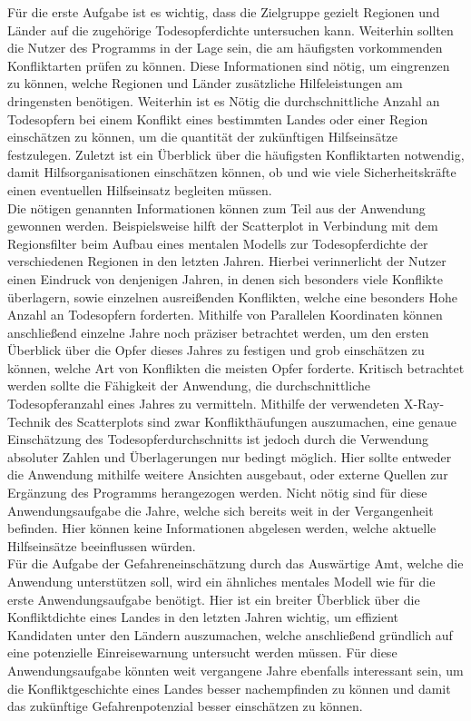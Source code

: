 \documentclass[usegeometry=true]{scrartcl}
\begin{document}
Für die erste Aufgabe ist es wichtig, dass die Zielgruppe gezielt Regionen und Länder auf die zugehörige Todesopferdichte untersuchen kann. Weiterhin sollten die Nutzer des Programms in der Lage sein, die am häufigsten vorkommenden Konfliktarten prüfen zu können. Diese Informationen sind nötig, um eingrenzen zu können, welche Regionen und Länder zusätzliche Hilfeleistungen am dringensten benötigen. Weiterhin ist es Nötig die durchschnittliche Anzahl an Todesopfern bei einem Konflikt eines bestimmten Landes oder einer Region einschätzen zu können, um die quantität der zukünftigen Hilfseinsätze festzulegen. Zuletzt ist ein Überblick über die häufigsten Konfliktarten notwendig, damit Hilfsorganisationen einschätzen können, ob und wie viele Sicherheitskräfte einen eventuellen Hilfseinsatz begleiten müssen.\\ Die nötigen genannten Informationen können zum Teil aus der Anwendung gewonnen werden. Beispielsweise hilft der Scatterplot in Verbindung mit dem Regionsfilter beim Aufbau eines mentalen Modells zur Todesopferdichte der verschiedenen Regionen in den letzten Jahren. Hierbei verinnerlicht der Nutzer einen Eindruck von denjenigen Jahren, in denen sich besonders viele Konflikte überlagern, sowie einzelnen \glqq ausreißenden\grqq{} Konflikten, welche eine besonders Hohe Anzahl an Todesopfern forderten. Mithilfe von Parallelen Koordinaten können anschließend einzelne Jahre noch präziser betrachtet werden, um den ersten Überblick über die Opfer dieses Jahres zu festigen und grob einschätzen zu können, welche Art von Konflikten die meisten Opfer forderte. Kritisch betrachtet werden sollte die Fähigkeit der Anwendung, die durchschnittliche Todesopferanzahl eines Jahres zu vermitteln. Mithilfe der verwendeten X-Ray-Technik des Scatterplots sind zwar Konflikthäufungen auszumachen, eine genaue Einschätzung des Todesopferdurchschnitts ist jedoch durch die Verwendung absoluter Zahlen und Überlagerungen nur bedingt möglich. Hier sollte entweder die Anwendung mithilfe weitere Ansichten ausgebaut, oder externe Quellen zur Ergänzung des Programms herangezogen werden. Nicht nötig sind für diese Anwendungsaufgabe die Jahre, welche sich bereits weit in der Vergangenheit befinden. Hier können keine Informationen abgelesen werden, welche aktuelle Hilfseinsätze beeinflussen würden.\\

Für die Aufgabe der Gefahreneinschätzung durch das Auswärtige Amt, welche die Anwendung unterstützen soll, wird ein ähnliches mentales Modell wie für die erste Anwendungsaufgabe benötigt. Hier ist ein breiter Überblick über die Konfliktdichte eines Landes in den letzten Jahren wichtig, um effizient Kandidaten unter den Ländern auszumachen, welche anschließend gründlich auf eine potenzielle Einreisewarnung untersucht werden müssen. Für diese Anwendungsaufgabe könnten weit vergangene Jahre ebenfalls interessant sein, um die Konfliktgeschichte eines Landes besser nachempfinden zu können und damit das zukünftige Gefahrenpotenzial besser einschätzen zu können.\\
\end{document}
